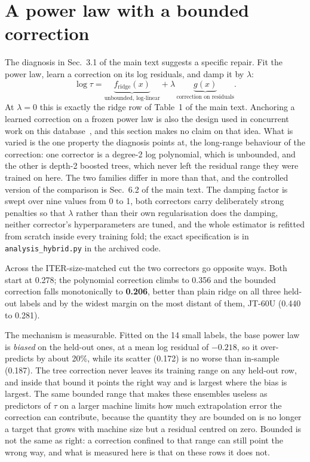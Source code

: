 \documentclass[12pt,letterpaper]{article}
\begin{document}
\section{A power law with a bounded correction}
\label{supp:hybrid}

The diagnosis in Sec.~3.1 of the main text suggests a specific repair. Fit the
power law, learn a correction on its log residuals, and damp it by $\lambda$:
\begin{equation}
\log\tau = \underbrace{f_{\text{ridge}}(x)}_{\text{unbounded, log-linear}}
         + \lambda\,\underbrace{g(x)}_{\text{correction on residuals}} .
\end{equation}
At $\lambda=0$ this is exactly the ridge row of Table~1 of the main text.
Anchoring a learned correction on a frozen power law is also the design used in
concurrent work on this database~\cite{wang}, and this section makes no claim on
that idea. What is varied is the one property the diagnosis points at, the
long-range behaviour of the correction: one corrector is a degree-2 log
polynomial, which is unbounded, and the other is depth-2 boosted trees, which
never left the residual range they were trained on here. The two families differ
in more than that, and the controlled version of the comparison is
Sec.~6.2 of the main text. The damping factor is swept over nine values from 0
to 1, both correctors carry deliberately strong penalties so that $\lambda$
rather than their own regularisation does the damping, neither corrector's
hyperparameters are tuned, and the whole estimator is refitted from scratch
inside every training fold; the exact specification is in
\texttt{analysis\_hybrid.py} in the archived code.

Across the ITER-size-matched cut the two correctors go opposite ways. Both start
at 0.278; the polynomial correction climbs to 0.356 and the bounded correction
falls monotonically to \textbf{0.206}, better than plain ridge on all three
held-out labels and by the widest margin on the most distant of them, JT-60U
(0.440 to 0.281).

The mechanism is measurable. Fitted on the 14 small labels, the base power law
is \emph{biased} on the held-out ones, at a mean log residual of $-0.218$, so it
over-predicts by about 20\%, while its scatter (0.172) is no worse than
in-sample (0.187). The tree correction never leaves its training range on any
held-out row, and inside that bound it points the right way and is largest where
the bias is largest. The same bounded range that makes these ensembles useless
as predictors of $\tau$ on a larger machine limits how much extrapolation error
the correction can contribute, because the quantity they are bounded on is no
longer a target that grows with machine size but a residual centred on zero.
Bounded is not the same as right: a correction confined to that range can still
point the wrong way, and what is measured here is that on these rows it does
not.
\end{document}
